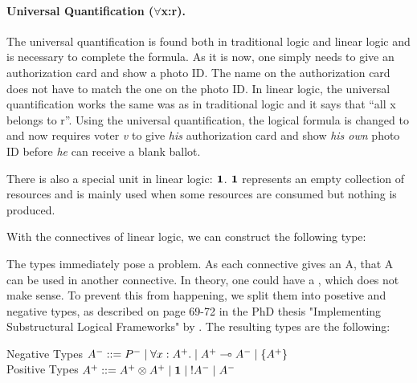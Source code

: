 \paragraph{Universal Quantification ($\forall$x:r).} The universal quantification is found both in traditional logic and linear logic and is necessary to complete the formula. As it is now, one simply needs to give an authorization card and show a photo ID. The name on the authorization card does not have to match the one on the photo ID.
In linear logic, the universal quantification works the same was as in traditional logic and it says that “all x belongs to r”. Using the universal quantification, the logical formula is changed to
and now requires voter \textit{v} to give \textit{his} authorization card and show \textit{his own} photo ID before \textit{he} can receive a blank ballot.

There is also a special unit in linear logic: $\mathord{\text{\rm\bf 1}}$. $\mathord{\text{\rm\bf 1}}$ represents an empty collection of resources and is mainly used when some resources are consumed but nothing is produced.

With the connectives of linear logic, we can construct the following type:

The types immediately pose a problem. As each connective gives an A, that A can be used in another connective. In theory, one could have a , which does not make sense. To prevent this from happening, we split them into posetive and negative types, as described on page 69-72 in the PhD thesis "Implementing Substructural Logical Frameworks"\cite{asncelf} by \citeauthor{asncelf}. The resulting types are the following:
\begin{texto}
Negative Types $A^- ::= P^- \; | \; \forall x:A^+. \; | \; A^+ \multimap A^- \; | \; \{ A^+ \} $\\
Positive Types \hspace{0.8pt} $A^+ ::= A^+ \otimes A^+ \; | \; \mathord{\text{\rm\bf 1}} \; | \; \mathord{\text{\rm !}} A^- \; | \; A^- $
\end{texto}

